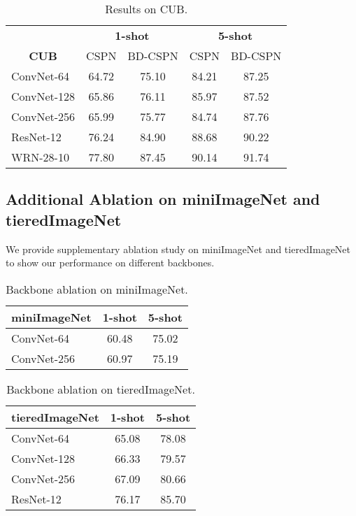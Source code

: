 \documentclass[runningheads]{llncs}
\begin{document}
\begin{table}[htbp]
\centering
\caption{Results on CUB.}
\begin{tabular}{lcccc}
\toprule
\multicolumn{1}{c}{}& \multicolumn{2}{c}{{\textbf{1-shot}}} & \multicolumn{2}{c}{{\textbf{5-shot}}} \\ 
\multicolumn{1}{c}{\multirow{-2}{*}{{\textbf{CUB}}}} & {CSPN}  & {BD-CSPN} & {CSPN}  & {BD-CSPN} \\  \midrule
{ConvNet-64}& {64.72} & {75.10}   & {84.21} & {87.25}   \\
{ConvNet-128}& {65.86} & {76.11}   & {85.97} & {87.52}   \\ 
{ConvNet-256}& {65.99} & {75.77}   & {84.74} & {87.76}   \\
{ResNet-12}& {76.24} & {84.90}   & {88.68} & {90.22}   \\ 
{WRN-28-10}& {77.80} & {87.45}   & {90.14} & {91.74}   \\ \midrule
\end{tabular}
\end{table}


\vspace*{2\baselineskip} 


\subsection{Additional Ablation on miniImageNet and tieredImageNet}
We provide supplementary ablation study on miniImageNet and tieredImageNet to show our performance on different backbones.




\begin{table*}
\centering
\caption{Backbone ablation on miniImageNet.}
\begin{tabular}{lcc}
\toprule
{\textbf{miniImageNet}} & {\textbf{1-shot}} & {\textbf{5-shot}} \\ \midrule
{ConvNet-64}            & {60.48}           & {75.02}           \\
{ConvNet-256}           & {60.97}           & {75.19}          \\ \midrule
\end{tabular}
\end{table*}







\begin{table}
\centering
\caption{Backbone ablation on tieredImageNet.}
\begin{tabular}{lcc}
\toprule
{\textbf{tieredImageNet}} & {\textbf{1-shot}} & {\textbf{5-shot}} \\ \midrule
{ConvNet-64}              & {65.08}           & {78.08}           \\
{ConvNet-128}             & {66.33}           & {79.57}           \\
{ConvNet-256}             & {67.09}           & {80.66}           \\
{ResNet-12}               & {76.17}           & {85.70}          \\ \midrule
\end{tabular}
\end{table}
\end{document}
